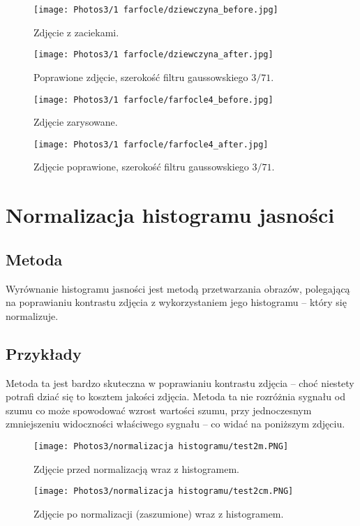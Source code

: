 \documentclass[]{mwart}
\begin{document}
\begin{figure}[H]
    \centering
    \texttt{[image: Photos3/1 farfocle/dziewczyna\_before.jpg]}
    \caption{Zdjęcie z zaciekami.}
\end{figure}
\begin{figure}[H]
    \centering
    \texttt{[image: Photos3/1 farfocle/dziewczyna\_after.jpg]}
    \caption{Poprawione zdjęcie, szerokość filtru gaussowskiego $3/71$.}
\end{figure}

\begin{figure}[H]
    \centering
    \texttt{[image: Photos3/1 farfocle/farfocle4\_before.jpg]}
    \caption{Zdjęcie zarysowane.}
\end{figure}
\begin{figure}[H]
    \centering
    \texttt{[image: Photos3/1 farfocle/farfocle4\_after.jpg]}
    \caption{Zdjęcie poprawione, szerokość filtru gaussowskiego $3/71$.}
\end{figure}






\section{Normalizacja histogramu jasności       }
\subsection{Metoda}
Wyrównanie histogramu jasności jest metodą przetwarzania obrazów, polegającą na
poprawianiu kontrastu zdjęcia z wykorzystaniem jego histogramu -- który się normalizuje.

\subsection{Przykłady}
Metoda ta jest bardzo skuteczna w poprawianiu kontrastu zdjęcia -- choć niestety potrafi dziać się
to kosztem jakości zdjęcia. Metoda ta nie rozróżnia sygnału od szumu co może spowodować wzrost wartości szumu,
przy jednoczesnym zmniejszeniu widoczności właściwego sygnału -- co widać na poniższym zdjęciu.

\begin{figure}[H]
    \centering
    \texttt{[image: Photos3/normalizacja histogramu/test2m.PNG]}
    \caption{Zdjęcie przed normalizacją wraz z histogramem.}
\end{figure}
\begin{figure}[H]
    \centering
    \texttt{[image: Photos3/normalizacja histogramu/test2cm.PNG]}
    \caption{Zdjęcie po normalizacji (zaszumione) wraz z histogramem.}
\end{figure}
\end{document}
